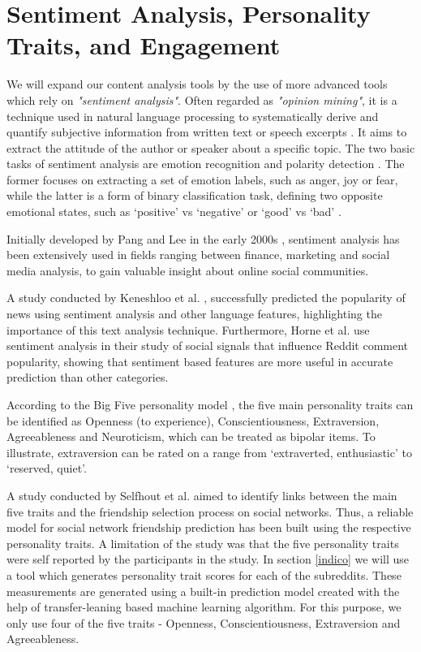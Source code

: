 \documentclass[bsc,frontabs,twoside,singlespacing,parskip,deptreport]{infthesis}
\begin{document}
\section{Sentiment Analysis, Personality Traits, and Engagement}\label{sentiment-analysis}

We will expand our content analysis tools by the use of more advanced tools which rely on \textit{"sentiment analysis"}. Often regarded as \textit{"opinion mining"}, it is a technique used in natural language processing to systematically derive and quantify subjective information from written text or speech excerpts \cite{sentiment4} \cite{sentiment5}. It aims to extract the attitude of the author or speaker about a specific topic. The two basic tasks of sentiment analysis are emotion recognition and polarity detection \cite{sentiment4}. The former focuses on extracting a set of emotion labels, such as anger, joy or fear, while the latter is a form of binary classification task, defining two opposite emotional states, such as ‘positive’ vs ‘negative’ or ‘good’ vs ‘bad' \cite{sentiment4}. 

Initially developed by Pang and Lee in the early 2000s \cite{sentiment2}, sentiment analysis has been extensively used in fields ranging between finance, marketing and social media analysis, to gain valuable insight about online social communities. 

A study conducted by Keneshloo et al. \cite{sentiment14}, successfully predicted the popularity of news using sentiment analysis and other language features, highlighting the importance of this text analysis technique. Furthermore, Horne et al. \cite{sentiment3} use sentiment analysis in their study of social signals that influence Reddit comment popularity, showing that sentiment based features are more useful in accurate prediction than other categories. 

According to the Big Five personality model \cite{sentiment6.1} \cite{sentiment6.2}, the five main personality traits can be identified as Openness (to experience), Conscientiousness, Extraversion, Agreeableness and Neuroticism, which can be treated as bipolar items. To illustrate, extraversion can be rated on a range from ‘extraverted, enthusiastic’ to ‘reserved, quiet’.

A study conducted by Selfhout et al. \cite{sentiment7} aimed to identify links between the main five traits and the friendship selection process on social networks. Thus, a reliable model for social network friendship prediction has been built using the respective personality traits. A limitation of the study was that the five personality traits were self reported by the participants in the study. In section \ref{indico} we will use a tool which generates personality trait scores for each of the subreddits. These measurements are generated using a built-in prediction model created with the help of transfer-leaning based machine learning algorithm. For this purpose, we only use four of the five traits - Openness, Conscientiousness, Extraversion and Agreeableness. 
\end{document}
